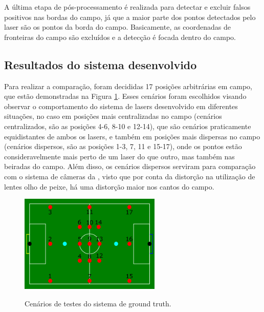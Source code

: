 \documentclass[acronym, symbols, table]{fei}
\begin{document}
				A última etapa de pós-processamento é realizada para detectar e excluir falsos positivos nas bordas do campo, já que a maior parte dos pontos detectados pelo laser são os pontos da borda do campo. Basicamente, as coordenadas de fronteiras do campo são excluídos e a detecção é focada dentro do campo.
		
			\subsection{Resultados do sistema desenvolvido}
		
				Para realizar a comparação, foram decididas 17 posições arbitrárias em campo, que estão demonstradas na Figura \ref{fig:cenarios_testes_ground_truth}. Esses cenários foram escolhidos visando observar o comportamento do sistema de lasers desenvolvido em diferentes situações, no caso em posições mais centralizadas no campo (cenários centralizados, são as posições 4-6, 8-10 e 12-14), que são cenários praticamente equidistantes de ambos os lasers, e também em posições mais dispersas no campo (cenários dispersos, são as posições 1-3, 7, 11 e 15-17), onde os pontos estão consideravelmente mais perto de um laser do que outro, mas também nas beiradas do campo. Além disso, os cenários dispersos serviram para comparação com o sistema de câmeras da , visto que por conta da distorção na utilização de lentes olho de peixe, há uma distorção maior nos cantos do campo.
				
				\begin{figure}[!htb]
					\centering
					\caption{Cenários de testes do sistema de ground truth.}
					\includegraphics[width=0.6\textwidth]{cenarios_testes.png}
					\label{fig:cenarios_testes_ground_truth}
				\end{figure}
			
\end{document}
